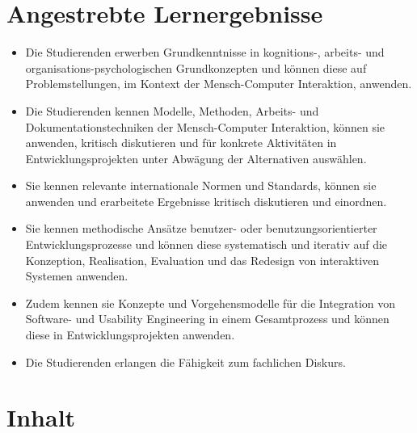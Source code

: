 \section*{Angestrebte
Lernergebnisse\label{/mi-2017/modulbeschreibungen-bachelor/BA_Mensch-Computer_Interaktion}}\label{angestrebte-lernergebnissepathlabelmi-2017modulbeschreibungen-bachelorbaux5fmensch-computerux5finteraktion}

\begin{itemize}
\tightlist
\item
  Die Studierenden erwerben Grundkenntnisse in kognitions-, arbeits- und
  organisations-psychologischen Grundkonzepten und können diese auf
  Problemstellungen, im Kontext der Mensch-Computer Interaktion,
  anwenden.
\item
  Die Studierenden kennen Modelle, Methoden, Arbeits- und
  Dokumentationstechniken der Mensch-Computer Interaktion, können sie
  anwenden, kritisch diskutieren und für konkrete Aktivitäten in
  Entwicklungsprojekten unter Abwägung der Alternativen auswählen.
\item
  Sie kennen relevante internationale Normen und Standards, können sie
  anwenden und erarbeitete Ergebnisse kritisch diskutieren und
  einordnen.
\item
  Sie kennen methodische Ansätze benutzer- oder benutzungsorientierter
  Entwicklungsprozesse und können diese systematisch und iterativ auf
  die Konzeption, Realisation, Evaluation und das Redesign von
  interaktiven Systemen anwenden.
\item
  Zudem kennen sie Konzepte und Vorgehensmodelle für die Integration von
  Software- und Usability Engineering in einem Gesamtprozess und können
  diese in Entwicklungsprojekten anwenden.
\item
  Die Studierenden erlangen die Fähigkeit zum fachlichen Diskurs.
\end{itemize}

\section*{Inhalt\label{/mi-2017/modulbeschreibungen-bachelor/BA_Mensch-Computer_Interaktion}}\label{inhaltpathlabelmi-2017modulbeschreibungen-bachelorbaux5fmensch-computerux5finteraktion}

